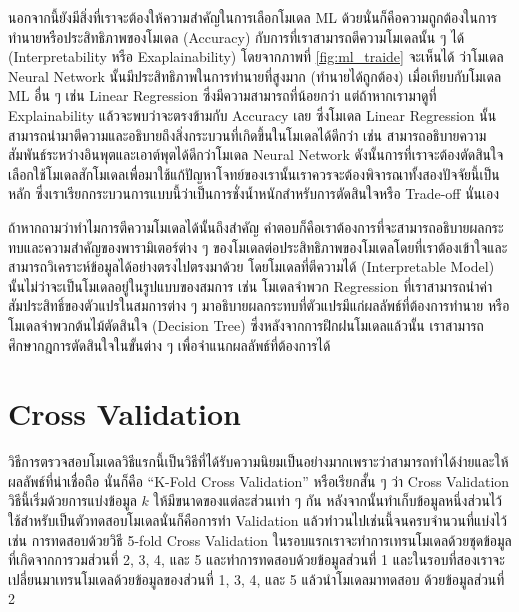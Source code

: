 นอกจากนี้ยังมีสิ่งที่เราจะต้องให้ความสำคัญในการเลือกโมเดล ML ด้วยนั่นก็คือความถูกต้องในการทำนายหรือประสิทธิภาพของโมเดล (Accuracy) 
กับการที่เราสามารถตีความโมเดลนั้น ๆ ได้ (Interpretability หรือ Exaplainability) โดยจากภาพที่ \ref{fig:ml_traide} จะเห็นได้%
ว่าโมเดล Neural Network นั้นมีประสิทธิภาพในการทำนายที่สูงมาก (ทำนายได้ถูกต้อง) เมื่อเทียบกับโมเดล ML อื่น ๆ เช่น Linear Regression 
ซึ่งมีความสามารถที่น้อยกว่า แต่ถ้าหากเรามาดูที่ Explainability แล้วจะพบว่าจะตรงข้ามกับ Accuracy เลย ซึ่งโมเดล Linear Regression 
นั้นสามารถนำมาตีความและอธิบายถึงสิ่งกระบวนที่เกิดขึ้นในโมเดลได้ดีกว่า เช่น สามารถอธิบายความสัมพันธ์ระหว่างอินพุตและเอาต์พุตได้ดีกว่าโมเดล 
Neural Network ดังนั้นการที่เราจะต้องตัดสินใจเลือกใช้โมเดลสักโมเดลเพื่อมาใช้แก้ปัญหาโจทย์ของเรานั้นเราควรจะต้องพิจารณาทั้งสองปัจจัยนี้เป็นหลัก
ซึ่งเราเรียกกระบวนการแบบนี้ว่าเป็นการชั่งน้ำหนักสำหรับการตัดสินใจหรือ Trade-off นั่นเอง

ถ้าหากถามว่าทำไมการตีความโมเดลได้นั้นถึงสำคัญ คำตอบก็คือเราต้องการที่จะสามารถอธิบายผลกระทบและความสำคัญของพารามิเตอร์ต่าง ๆ 
ของโมเดลต่อประสิทธิภาพของโมเดลโดยที่เราต้องเข้าใจและสามารถวิเคราะห์ข้อมูลได้อย่างตรงไปตรงมาด้วย โดยโมเดลที่ตีความได้ (Interpretable 
Model) นั้นไม่ว่าจะเป็นโมเดลอยู่ในรูปแบบของสมการ เช่น โมเดลจำพวก Regression ที่เราสามารถนำค่าสัมประสิทธิ์ของตัวแปรในสมการต่าง ๆ 
มาอธิบายผลกระทบที่ตัวแปรมีแก่ผลลัพธ์ที่ต้องการทำนาย หรือโมเดลจำพวกต้นไม้ตัดสินใจ (Decision Tree) ซึ่งหลังจากการฝึกฝนโมเดลแล้วนั้น 
เราสามารถศึกษากฎการตัดสินใจในขั้นต่าง ๆ เพื่อจำแนกผลลัพธ์ที่ต้องการได้

\section{Cross Validation}
\label{sec:cross_val}

วิธีการตรวจสอบโมเดลวิธีแรกนี้เป็นวิธีที่ได้รับความนิยมเป็นอย่างมากเพราะว่าสามารถทำได้ง่ายและให้ผลลัพธ์ที่น่าเชื่อถือ นั่นก็คือ 
\enquote{K-Fold Cross Validation} หรือเรียกสั้น ๆ ว่า Cross Validation วิธีนี้เริ่มด้วยการแบ่งข้อมูล $k$ ให้มีขนาดของแต่ละส่วนเท่า ๆ กัน 
หลังจากนั้นทำเก็บข้อมูลหนึ่งส่วนไว้ใช้สำหรับเป็นตัวทดสอบโมเดลนั่นก็คือการทำ Validation แล้วทําวนไปเช่นนี้จนครบจํานวนที่แบ่งไว้ เช่น 
การทดสอบด้วยวิธี 5-fold Cross Validation ในรอบแรกเราจะทำการเทรนโมเดลด้วยชุดข้อมูลที่เกิดจากการวมส่วนที่ 2, 3, 4, และ 5 
และทำการทดสอบด้วยข้อมูลส่วนที่ 1 และในรอบที่สองเราจะเปลี่ยนมาเทรนโมเดลด้วยข้อมูลของส่วนที่ 1, 3, 4, และ 5 แล้วนำโมเดลมาทดสอบ%
ด้วยข้อมูลส่วนที่ 2

